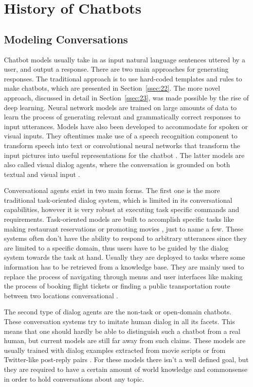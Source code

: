 \documentclass[12pt]{article}
\begin{document}
\newpage\section{History of Chatbots} \label{sec:history}

\subsection{Modeling Conversations} \label{ssec:21}
Chatbot models usually take in as input natural language sentences uttered by a user, and output a response. There are two main approaches for generating responses. The traditional approach is to use hard-coded templates and rules to make chatbots, which are presented in Section~\ref{ssec:22}. The more novel approach, discussed in detail in Section~\ref{ssec:23}, was made possible by the rise of deep learning. Neural network models are trained on large amounts of data to learn the process of generating relevant and grammatically correct responses to input utterances. Models have also been developed to accommodate for spoken or visual inputs. They oftentimes make use of a speech recognition component to transform speech into text \cite{Serban:2017} or convolutional neural networks \cite{Imagenet:2012} that transform the input pictures into useful representations for the chatbot \cite{Havrylov:2017}. The latter models are also called visual dialog agents, where the conversation is grounded on both textual and visual input \cite{Das:2017}.

Conversational agents exist in two main forms. The first one is the more traditional task-oriented dialog system, which is limited in its conversational capabilities, however it is very robust at executing task specific commands and requirements. Task-oriented models are built to accomplish specific tasks like making restaurant reservations \cite{Joshi:2017,Bordes:2016} or promoting movies \cite{Yu:2017}, just to name a few. These systems often don't have the ability to respond to arbitrary utterances since they are limited to a specific domain, thus users have to be guided by the dialog system towards the task at hand. Usually they are deployed to tasks where some information has to be retrieved from a knowledge base. They are mainly used to replace the process of navigating through menus and user interfaces like making the process of booking flight tickets or finding a public transportation route between two locations conversational \cite{Zhao:2017}.  

The second type of dialog agents are the non-task or open-domain chatbots. These conversation systems try to imitate human dialog in all its facets. This means that one should hardly be able to distinguish such a chatbot from a real human, but current models are still far away from such claims. These models are usually trained with dialog examples extracted from movie scripts or from Twitter-like post-reply pairs \cite{Vinyals:2015,Shang:2015,Serban:2015,Li:2016}. For these models there isn't a well defined goal, but they are required to have a certain amount of world knowledge and commonsense in order to hold conversations about any topic.
\end{document}
